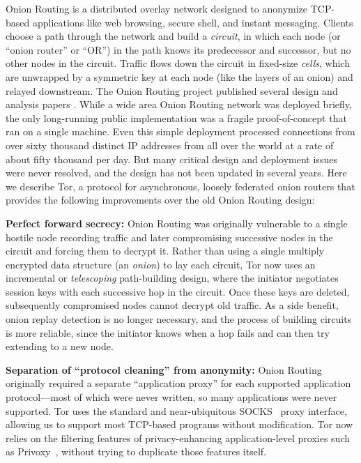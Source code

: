 \documentclass[times,10pt,twocolumn]{article}
\begin{document}
Onion Routing is a distributed overlay network designed to anonymize
TCP-based applications like web browsing, secure shell,
and instant messaging. Clients choose a path through the network and
build a \emph{circuit}, in which each node (or ``onion router'' or ``OR'')
in the path knows its predecessor and successor, but no other nodes in
the circuit.  Traffic flows down the circuit in fixed-size
\emph{cells}, which are unwrapped by a symmetric key at each node
(like the layers of an onion) and relayed downstream. The
Onion Routing project published several design and analysis
papers \cite{or-ih96,or-jsac98,or-discex00,or-pet00}. While a wide area Onion
Routing network was deployed briefly, the only long-running
public implementation was a fragile
proof-of-concept that ran on a single machine. Even this simple deployment
processed connections from over sixty thousand distinct IP addresses from
all over the world at a rate of about fifty thousand per day.
But many critical design and deployment issues were never
resolved, and the design has not been updated in several years. Here
we describe Tor, a protocol for asynchronous, loosely federated onion
routers that provides the following improvements over the old Onion
Routing design:

\textbf{Perfect forward secrecy:} Onion Routing
was originally vulnerable to a single hostile node recording traffic and
later compromising successive nodes in the circuit and forcing them
to decrypt it. Rather than using a single multiply encrypted data
structure (an \emph{onion}) to lay each circuit,
Tor now uses an incremental or \emph{telescoping} path-building design,
where the initiator negotiates session keys with each successive hop in
the circuit.  Once these keys are deleted, subsequently compromised nodes
cannot decrypt old traffic.  As a side benefit, onion replay detection
is no longer necessary, and the process of building circuits is more
reliable, since the initiator knows when a hop fails and can then try
extending to a new node.

\textbf{Separation of ``protocol cleaning'' from anonymity:}
Onion Routing originally required a separate ``application
proxy'' for each supported application protocol---most of which were
never written, so many applications were never supported.  Tor uses the
standard and near-ubiquitous SOCKS~\cite{socks4} proxy interface, allowing
us to support most TCP-based programs without modification.  Tor now
relies on the filtering features of privacy-enhancing
application-level proxies such as Privoxy~\cite{privoxy}, without trying
to duplicate those features itself.
\end{document}
